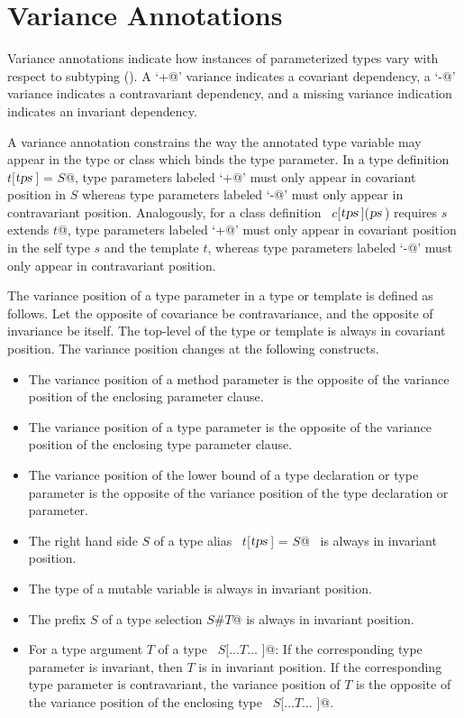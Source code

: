 \section{Variance Annotations}\label{sec:variances}

Variance annotations indicate how instances of parameterized types
vary with respect to subtyping ().  A
`\lstinline@+@' variance indicates a covariant dependency, a
`\lstinline@-@' variance indicates a contravariant dependency, and a
missing variance indication indicates an invariant dependency.

A variance annotation constrains the way the annotated type variable
may appear in the type or class which binds the type parameter.  In a
type definition ~\lstinline@type $t$[$\mbox{\sl tps}\,$] = $S$@, type parameters labeled
`\lstinline@+@' must only appear in covariant position in $S$ whereas
type parameters labeled `\lstinline@-@' must only appear in contravariant
position. Analogously, for a class definition
~\lstinline@class $c$[$\mbox{\sl tps}\,$]($\mbox{\sl ps}\,$) requires $s$ extends $t$@, type parameters labeled
`\lstinline@+@' must only appear in covariant position in the self type
$s$ and the template $t$, whereas type
parameters labeled `\lstinline@-@' must only appear in contravariant
position. 

The variance position of a type parameter in a type or template is
defined as follows.  Let the opposite of covariance be contravariance,
and the opposite of invariance be itself.  The top-level of the type
or template is always in covariant position. The variance position
changes at the following constructs.
\begin{itemize}
\item
The variance position of a method parameter is the opposite of the 
variance position of the enclosing parameter clause.
\item
The variance position of a type parameter is the opposite of the
variance position of the enclosing type parameter clause.
\item
The variance position of the lower bound of a type declaration or type parameter 
is the opposite of the variance position of the type declaration or parameter.  
\item
The right hand side $S$ of a type alias ~\lstinline@type $t$[$\mbox{\sl tps}\,$] = $S$@~ 
is always in invariant position.
\item
The type of a mutable variable is always in invariant position.
\item 
The prefix $S$ of a type selection \lstinline@$S$#$T$@ is always in invariant position.
\item
For a type argument $T$ of a type ~\lstinline@$S$[$\ldots T \ldots$ ]@: If the
corresponding type parameter is invariant, then $T$ is in
invariant position.  If the corresponding type parameter is
contravariant, the variance position of $T$ is the opposite of
the variance position of the enclosing type ~\lstinline@$S$[$\ldots T \ldots$ ]@.
\end{itemize}

